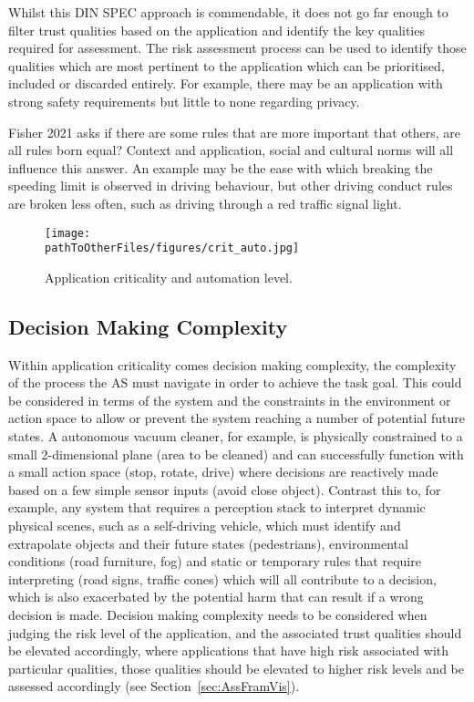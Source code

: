 Whilst this DIN SPEC approach is commendable, it does not go far enough to filter trust qualities based on the application and identify the key qualities required for assessment. The risk assessment process can be used to identify those qualities which are most pertinent to the application which can be prioritised, included or discarded entirely. For example, there may be an application with strong safety requirements but little to none regarding privacy. 

Fisher 2021 asks if there are some rules that are more important that others, are all rules born equal? Context and application, social and cultural norms will all influence this answer. An example may be the ease with which breaking the speeding limit is observed in driving behaviour, but other driving conduct rules are broken less often, such as driving through a red traffic signal light.

\begin{figure}[]
    \centering
    \texttt{[image: \\pathToOtherFiles/figures/crit\_auto.jpg]}
    \caption{Application criticality and automation level.}
    \label{fig:critauto}
\end{figure}

\subsection{Decision Making Complexity} \label{sec:appcrit-dec}

Within application criticality comes decision making complexity, the complexity of the process the AS must navigate in order to achieve the task goal. This could be considered in terms of the system and the constraints in the environment or action space to allow or prevent the system reaching a number of potential future states. A autonomous vacuum cleaner, for example, is physically constrained to a small 2-dimensional plane (area to be cleaned) and can successfully function with a small action space (stop, rotate, drive) where decisions are reactively made based on a few simple sensor inputs (avoid close object). 
%
Contrast this to, for example, any system that requires a perception stack to interpret dynamic physical scenes, such as a self-driving vehicle, which must identify and extrapolate objects and their future states (pedestrians), environmental conditions (road furniture, fog) and static or temporary rules that require interpreting (road signs, traffic cones) which will all contribute to a decision, which is also exacerbated by the potential harm that can result if a wrong decision is made. 
%
Decision making complexity needs to be considered when judging the risk level of the application, and the associated trust qualities should be elevated accordingly, where applications that have high risk associated with particular qualities, those qualities should be elevated to higher risk levels and be assessed accordingly (see Section~\ref{sec:AssFramVis}).  

